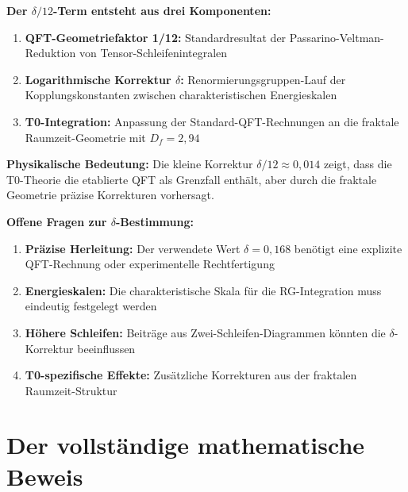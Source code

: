 \documentclass[12pt,a4paper]{article}
\theoremstyle{remark}
\begin{document}
\begin{summary}
	\textbf{Der $\delta/12$-Term entsteht aus drei Komponenten:}
	
	\begin{enumerate}
		\item \textbf{QFT-Geometriefaktor 1/12:} Standardresultat der Passarino-Veltman-Reduktion von Tensor-Schleifenintegralen
		\item \textbf{Logarithmische Korrektur $\delta$:} Renormierungsgruppen-Lauf der Kopplungskonstanten zwischen charakteristischen Energieskalen
		\item \textbf{T0-Integration:} Anpassung der Standard-QFT-Rechnungen an die fraktale Raumzeit-Geometrie mit $D_f = 2{,}94$
	\end{enumerate}
	
	\textbf{Physikalische Bedeutung:}
	Die kleine Korrektur $\delta/12 \approx 0{,}014$ zeigt, dass die T0-Theorie die etablierte QFT als Grenzfall enthält, aber durch die fraktale Geometrie präzise Korrekturen vorhersagt.
\end{summary}

\begin{critical}
	\textbf{Offene Fragen zur $\delta$-Bestimmung:}
	\begin{enumerate}
		\item \textbf{Präzise Herleitung:} Der verwendete Wert $\delta = 0{,}168$ benötigt eine explizite QFT-Rechnung oder experimentelle Rechtfertigung
		\item \textbf{Energieskalen:} Die charakteristische Skala für die RG-Integration muss eindeutig festgelegt werden
		\item \textbf{Höhere Schleifen:} Beiträge aus Zwei-Schleifen-Diagrammen könnten die $\delta$-Korrektur beeinflussen
		\item \textbf{T0-spezifische Effekte:} Zusätzliche Korrekturen aus der fraktalen Raumzeit-Struktur
	\end{enumerate}
\end{critical}
\section{Der vollständige mathematische Beweis}
\end{document}
